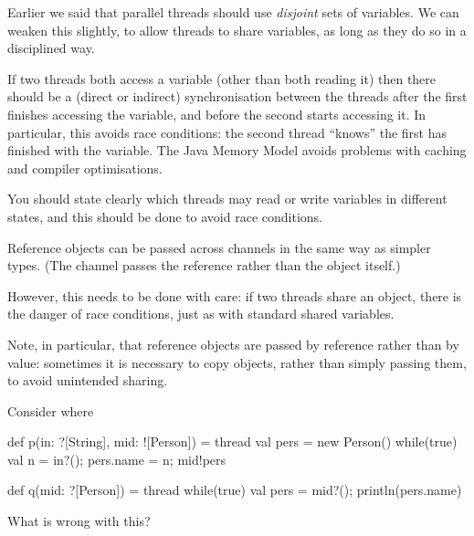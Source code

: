 \documentclass[notes,color]{sepslide0}
\begin{document}
\begin{slide}

Earlier we said that parallel threads should use \emph{disjoint} sets of
variables.  We can weaken this slightly, to allow threads to share
variables, as long as they do so in a disciplined way. 

If two threads both access a variable (other than both reading it) then
there should be a (direct or indirect) synchronisation between the threads
after the first finishes accessing the variable, and before the second starts
accessing it.  In particular, this avoids race conditions: the second thread
``knows'' the first has finished with the variable.  The Java Memory Model
avoids problems with caching and compiler optimisations.

You should state clearly which threads may read or write variables in
different states, and this should be done to avoid race conditions.
\end{slide}



\begin{slide}

Reference objects can be passed across channels in the same way as simpler
types.  (The channel passes the reference rather than the object itself.)

However, this needs to be done with care: if two threads share an object,
there is the danger of race conditions, just as with standard shared
variables. 
 
Note, in particular, that reference objects are passed by reference rather
than by value: sometimes it is necessary to copy objects, rather than simply
passing them, to avoid unintended sharing.
\end{slide}



\begin{slide}

Consider  where
%
\begin{scala}
def p(in: ?[String], mid: ![Person]) = thread{
  val pers = new Person()
  while(true){ val n = in?(); pers.name = n; mid!pers }
}

def q(mid: ?[Person]) = thread{
  while(true){ val pers = mid?(); println(pers.name) }
} 
\end{scala}
%
What is wrong with this?
\end{slide}
\end{document}
